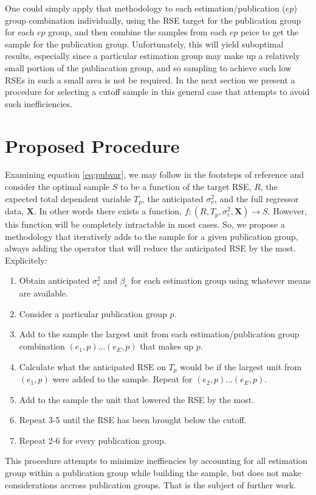 \documentclass[11pt]{article}\usepackage[]{graphicx}\usepackage[]{color}
\begin{document}
One could simply apply that methodology to each estimation/publication ($ep$) group combination individually, using the RSE target for the publication group for each $ep$ group, and then combine the samples from each $ep$ peice to get the sample for the publication group. Unfortunately, this will yield suboptimal results, especially since a particular estimation group may make up a relatively small portion of the publiacation group, and so sampling to achieve such low RSEs in such a small area is not be required. In the next section we present a procedure for selecting a cutoff sample in this general case that attempts to avoid such inefficiencies.

\section{Proposed Procedure}
Examining equation \ref{eq:pubvar}, we may follow in the footsteps of reference \cite{Knaub2013} 
and consider the optimal sample $S$ to be a function of the target RSE, $R$, the expected total dependent variable $T_p$, the anticipated $\sigma_e^2$, and the full regressor data, $\mathbf{X}$. In other words there exists a function, $f: (R,T_p,\sigma_e^2,\mathbf{X}) \rightarrow S$. However, this function will be completely intractable in most cases. So, we propose a methodology that iteratively adds to the sample for a given publication group, always adding the operator that will reduce the anticipated RSE by the most. Explicitely:
\begin{enumerate}
\item
Obtain anticipated $\sigma_e^2$ and $\beta_e$ for each estimation group using whatever means are available.
\item
Consider a particular publication group $p$.
\item
Add to the sample the largest unit from each estimation/publication group combination $(e_1,p) ... (e_E,p)$ that makes up $p$.
\item
Calculate what the anticipated RSE on $T_p$ would be if the largest unit from $(e_1,p)$ were added to the sample. Repeat for $(e_2,p) ... (e_E,p)$. 
\item
Add to the sample the unit that lowered the RSE by the most.
\item
Repeat 3-5 until the RSE has been brought below the cutoff.
\item
Repeat 2-6 for every publication group.
\end{enumerate}
This procedure attempts to minimize ineffiencies by accounting for all estimation group within a publication group while building the sample, but does not make considerations accross publication groups. That is the subject of further work.
\end{document}
